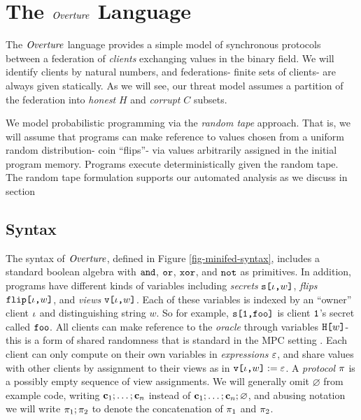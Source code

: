 \section{The $\mathit{Overture}$ Language}
\label{section-minicat}

The $\mathit{Overture}$ language provides a simple model of synchronous
protocols between a federation of \emph{clients} exchanging values in
the binary field. We will identify clients by natural numbers, and
federations- finite sets of clients- are always given statically.
As we will see, our threat model assumes a partition of the federation
into \emph{honest} $H$ and \emph{corrupt} $C$ subsets.

We model probabilistic programming via the \emph{random tape}
approach. That is, we will assume that programs can make reference to
values chosen from a uniform random distribution- coin ``flips''- via
values arbitrarily assigned in the initial program memory.  Programs
execute deterministically given the random tape. The random tape
formulation supports our automated analysis as we discuss in
section 

\subsection{Syntax} The syntax of $\mathit{Overture}$, defined in
Figure \ref{fig-minifed-syntax}, includes a standard boolean algebra
with $\texttt{and}$, $\texttt{or}$, $\texttt{xor}$, and $\texttt{not}$ as primitives. In addition,
programs have different kinds of variables including \emph{secrets}
$\texttt{s[}\iota\texttt{,}w\texttt{]}$, \emph{flips} $\texttt{flip[}\iota\texttt{,}w\texttt{]}$, and \emph{views}
$\texttt{v[}\iota\texttt{,}w\texttt{]}$.  Each of these variables is indexed by an ``owner''
client $\iota$ and distinguishing string $w$. So for example,
$\texttt{s[}\texttt{1}\texttt{,}\texttt{foo}\texttt{]}$ is client $\texttt{1}$'s secret called
$\texttt{foo}$. All clients can make reference to the \emph{oracle}
through variables $\texttt{H[}w\texttt{]}$- this is a form of shared randomness
that is standard in the MPC setting \cite{evans2018pragmatic}.  Each client can only
compute on their own variables in \emph{expressions} $\varepsilon$, and share
values with other clients by assignment to their views as in
$\texttt{v[}\iota\texttt{,}w\texttt{]} := \varepsilon$.  A \emph{protocol} $\pi$ is a
possibly empty sequence of view assignments. We will generally omit
$\varnothing$ from example code, writing $\mathbf{c}_1;\ldots;\mathbf{c}_n$
instead of $\mathbf{c}_1;\ldots;\mathbf{c}_n;\varnothing$, and abusing notation we will
write $\pi_1;\pi_2$ to denote the concatenation of $\pi_1$
and $\pi_2$.



